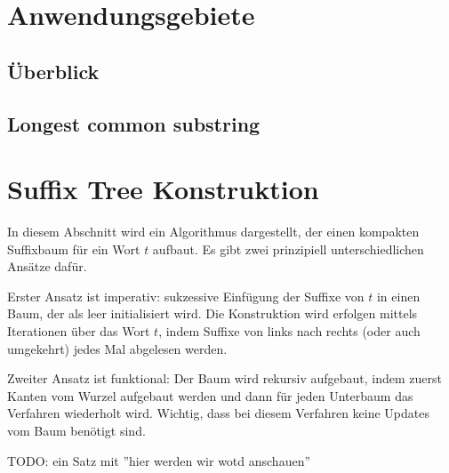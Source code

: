 \documentclass[12pt]{report}
\begin{document}
\section{Anwendungsgebiete}
\label{sec:Anwendungsgebiete}

\subsection{Überblick}
\label{sec:Ueberblick}

\subsection{Longest common substring}
\label{sec:longestCommonSubstring}

\section{Suffix Tree Konstruktion}
\label{sec:SuffixTreeKonstruktion}

In diesem Abschnitt wird ein Algorithmus dargestellt, der einen kompakten Suffixbaum für ein Wort $t$ aufbaut. Es gibt zwei prinzipiell unterschiedlichen Ansätze dafür.

Erster Ansatz ist imperativ: sukzessive Einfügung der Suffixe von $t$ in einen Baum, der als leer initialisiert wird. Die Konstruktion wird erfolgen mittels Iterationen über das Wort $t$, indem Suffixe von links nach rechts (oder auch umgekehrt) jedes Mal abgelesen werden.

Zweiter Ansatz ist funktional: Der Baum wird rekursiv aufgebaut, indem zuerst Kanten vom Wurzel aufgebaut werden und dann für jeden Unterbaum das Verfahren wiederholt wird. Wichtig, dass bei diesem Verfahren keine Updates vom Baum benötigt sind.

TODO: ein Satz mit ''hier werden wir wotd anschauen''


\end{document}
